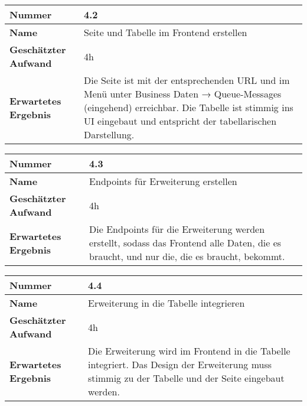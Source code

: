 \begin{longtable}{p{}|p{}}
	\hline
	\textbf{Nummer}                 & \textbf{4.2}            \\
	\hline
	\textbf{Name}   				& Seite und Tabelle im Frontend erstellen                  \\
	\hline
	\textbf{Geschätzter Aufwand}    & 4h                                    \\
	\hline
	\textbf{Erwartetes Ergebnis}    & Die Seite ist mit der entsprechenden URL und im Menü unter Business Daten → Queue-Messages (eingehend) erreichbar. Die Tabelle ist stimmig ins UI eingebaut und entspricht der tabellarischen Darstellung.                                    \\
	\hline
\end{longtable}\label{tab:realisieren-4.2}

\begin{longtable}{p{}|p{}}
	\hline
	\textbf{Nummer}                 & \textbf{4.3}            \\
	\hline
	\textbf{Name}   				& Endpoints für Erweiterung erstellen                  \\
	\hline
	\textbf{Geschätzter Aufwand}    & 4h                                    \\
	\hline
	\textbf{Erwartetes Ergebnis}    & Die Endpoints für die Erweiterung werden erstellt, sodass das Frontend alle Daten, die es braucht, und nur die, die es braucht, bekommt.                                    \\
	\hline
\end{longtable}\label{tab:realisieren-4.3}

\begin{longtable}{p{}|p{}}
	\hline
	\textbf{Nummer}                 & \textbf{4.4}            \\
	\hline
	\textbf{Name}   				& Erweiterung in die Tabelle integrieren                  \\
	\hline
	\textbf{Geschätzter Aufwand}    & 4h                                    \\
	\hline
	\textbf{Erwartetes Ergebnis}    & Die Erweiterung wird im Frontend in die Tabelle integriert. Das Design der Erweiterung muss stimmig zu der Tabelle und der Seite eingebaut werden.                                    \\
	\hline
\end{longtable}\label{tab:realisieren-4.4}

